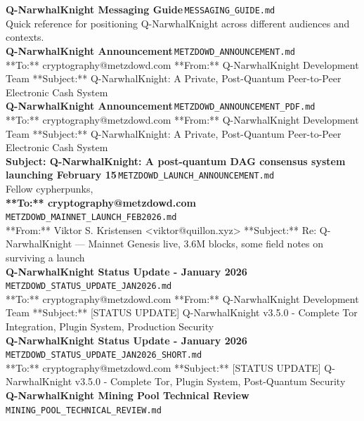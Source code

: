 \documentclass[11pt,a4paper]{article}
\begin{document}
\noindent\textbf{Q-NarwhalKnight Messaging Guide}\,\textcolor{qgray}{\small \texttt{MESSAGING\_GUIDE.md}}\\
Quick reference for positioning Q-NarwhalKnight across different audiences and contexts.\\[6pt]
\noindent\textbf{Q-NarwhalKnight Announcement}\,\textcolor{qgray}{\small \texttt{METZDOWD\_ANNOUNCEMENT.md}}\\
**To:** cryptography@metzdowd.com **From:** Q-NarwhalKnight Development Team **Subject:** Q-NarwhalKnight: A Private, Post-Quantum Peer-to-Peer Electronic Cash System\\[6pt]
\noindent\textbf{Q-NarwhalKnight Announcement}\,\textcolor{qgray}{\small \texttt{METZDOWD\_ANNOUNCEMENT\_PDF.md}}\\
**To:** cryptography@metzdowd.com **From:** Q-NarwhalKnight Development Team **Subject:** Q-NarwhalKnight: A Private, Post-Quantum Peer-to-Peer Electronic Cash System\\[6pt]
\noindent\textbf{Subject: Q-NarwhalKnight: A post-quantum DAG consensus system launching February 15}\,\textcolor{qgray}{\small \texttt{METZDOWD\_LAUNCH\_ANNOUNCEMENT.md}}\\
Fellow cypherpunks,\\[6pt]
\noindent\textbf{**To:** cryptography@metzdowd.com}\,\textcolor{qgray}{\small \texttt{METZDOWD\_MAINNET\_LAUNCH\_FEB2026.md}}\\
**From:** Viktor S. Kristensen \textless{}viktor@quillon.xyz\textgreater{} **Subject:** Re: Q-NarwhalKnight --- Mainnet Genesis live, 3.6M blocks, some field notes on surviving a launch\\[6pt]
\noindent\textbf{Q-NarwhalKnight Status Update - January 2026}\,\textcolor{qgray}{\small \texttt{METZDOWD\_STATUS\_UPDATE\_JAN2026.md}}\\
**To:** cryptography@metzdowd.com **From:** Q-NarwhalKnight Development Team **Subject:** [STATUS UPDATE] Q-NarwhalKnight v3.5.0 - Complete Tor Integration, Plugin System, Production Security\\[6pt]
\noindent\textbf{Q-NarwhalKnight Status Update - January 2026}\,\textcolor{qgray}{\small \texttt{METZDOWD\_STATUS\_UPDATE\_JAN2026\_SHORT.md}}\\
**To:** cryptography@metzdowd.com **Subject:** [STATUS UPDATE] Q-NarwhalKnight v3.5.0 - Complete Tor, Plugin System, Post-Quantum Security\\[6pt]
\noindent\textbf{Q-NarwhalKnight Mining Pool Technical Review}\,\textcolor{qgray}{\small \texttt{MINING\_POOL\_TECHNICAL\_REVIEW.md}}\\
\end{document}
